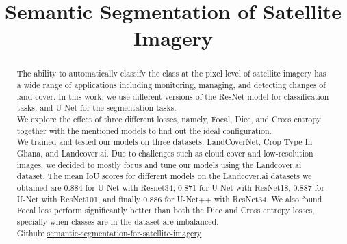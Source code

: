 \documentclass[conference]{IEEEtran}
\begin{document}
\title{Semantic Segmentation of Satellite Imagery \\}
\author{
\and
{}
\and
{}
}
\maketitle


\begin{abstract}
The ability to automatically classify the class at the pixel level of satellite imagery has a wide range of applications including monitoring, managing, and detecting changes of land cover. In this work, we use different versions of the ResNet model for classification tasks, and U-Net for the segmentation tasks. \\ We explore the effect of three different losses, namely, Focal, Dice, and Cross entropy together with the mentioned models to find out the ideal configuration.
\\  \indent We trained and tested our models on three datasets: LandCoverNet, Crop Type In Ghana, and Landcover.ai. Due to challenges such as cloud cover and low-resolution images, we decided to mostly focus and tune our models using the Landcover.ai dataset. The mean IoU scores for different models on the Landcover.ai datasets we obtained are 0.884 for U-Net with Resnet34, 0.871 for U-Net with ResNet18, 0.887 for U-Net with ResNet101, and finally 0.886 for U-Net++ with ResNet34. We also found Focal loss perform significantly better than both the Dice and Cross entropy losses, specially when classes are in the dataset are imbalanced.  \\

Github: \href{https://github.com/roldanjrgl/semantic_segmentation_for_satellite_imagery}{semantic-segmentation-for-satellite-imagery}
\end{abstract}
\end{document}
